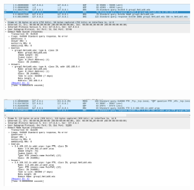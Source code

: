 \documentclass{article}
\begin{document}
\begin{figure}[h!]
	\centering
	\includegraphics[width=0.9\textwidth]{src/11.png}
	\caption{}
	\label{fig:11}
\end{figure}
\begin{figure}[h!]
	\centering
	\includegraphics[width=0.9\textwidth]{src/12.png}
	\caption{}
	\label{fig:12}
\end{figure}
\end{document}
